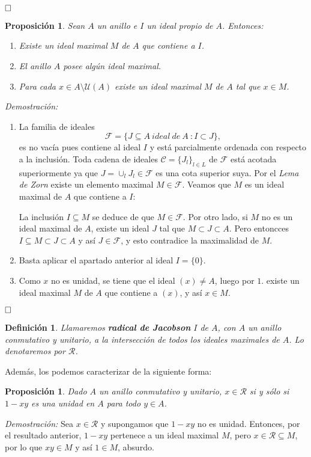 \documentclass[12pt]{article}
\newtheorem{proposition}[theorem]{Proposición}
\newtheorem{definition}[theorem]{Definición}
\begin{document}
$\hfill \square$

\begin{proposition}Sean $A$ un anillo e $I$ un ideal propio de $A$. Entonces:
\begin{enumerate}
\item Existe un ideal maximal $M$ de $A$ que contiene a $I$.
\item El anillo $A$ posee algún ideal maximal.
\item Para cada $x \in A \setminus \mathcal{U}(A)$ existe un ideal maximal $M$ de $A$ tal que $x \in M$.
\end{enumerate} 
\end{proposition}
\emph{Demostración: }\begin{enumerate}
\item La familia de ideales $$\mathcal{F} = \lbrace J \subseteq A~ideal~de~A~:I \subset J \rbrace,$$  es no vacía pues contiene al ideal $I$ y está parcialmente ordenada con respecto a la inclusión. Toda cadena de ideales $\mathcal{C} = \lbrace J_l \rbrace_{l \in L}$ de $\mathcal{F}$ está acotada superiormente ya que $J = \cup_l J_l \in \mathcal{F}$ es una cota superior suya. Por el \textit{Lema de Zorn} existe un elemento maximal $M \in \mathcal{F}$. Veamos que $M$ es un ideal maximal de $A$ que contiene a $I$:

La inclusión $I \subseteq M$ se deduce de que $M \in \mathcal{F}$. Por otro lado, si $M$ no es un ideal maximal de $A$, existe un ideal $J$ tal que $M \subset J \subset A$. Pero entoncces $I \subseteq M \subset J \subset A$ y así $J \in \mathcal{F}$, y esto contradice la maximalidad de $M$.
\item Basta aplicar el apartado anterior al ideal $I = \lbrace 0 \rbrace$.
\item Como $x$ no es unidad, se tiene que el ideal $(x) \neq A$, luego por $1.$ existe un ideal maximal $M$ de $A$ que contiene a $(x)$, y así $x \in M$.
\end{enumerate}

$\hfill \square$

\begin{definition} Llamaremos \textbf{radical de Jacobson} $I$ de $A$, con $A$ un anillo conmutativo y unitario, a la intersección de todos los ideales maximales de $A$. Lo denotaremos por $\mathcal{R}$.
\end{definition}

Además, los podemos caracterizar de la siguiente forma:

\begin{proposition}Dado $A$ un anillo conmutativo y unitario, $x \in \mathcal{R}$ si y sólo si $1-xy$ es una unidad en $A$ para todo $y \in A$.
\end{proposition}
\emph{Demostración: }Sea $x \in \mathcal{R}$ y supongamos que $1-xy$ no es unidad. Entonces, por el resultado anterior, $1-xy$ pertenece a un ideal maximal $M$, pero $x \in \mathcal{R} \subseteq M$, por lo que $xy \in M$ y así $1 \in M$, absurdo. 
\end{document}
